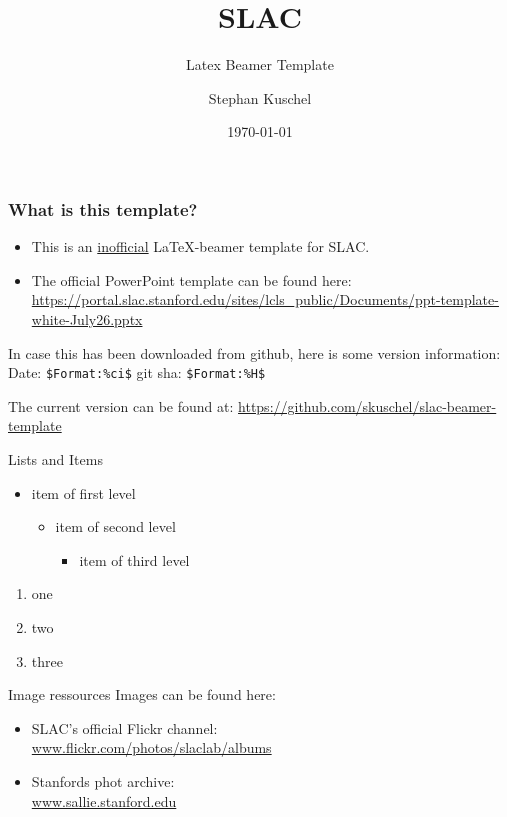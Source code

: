 \documentclass{beamer}
\title{SLAC}
\subtitle{Latex Beamer Template}
\author{Stephan Kuschel}
\institute{SLAC National Accelerator Laboratory}
\date{\today}
\begin{document}
\frame{\titlepage}


\begin{frame}[fragile]
\frametitle{What is this template?}
\begin{itemize}
\item This is an \underline{inofficial} \LaTeX-beamer template for SLAC.
\item The official PowerPoint template can be found here: \\
\url{https://portal.slac.stanford.edu/sites/lcls_public/Documents/ppt-template-white-July26.pptx}
\end{itemize}
In case this has been downloaded from github, here is some version information: \\
Date: \verb|$Format:%ci$|
git sha: \verb|$Format:%H$|

The current version can be found at:
\url{https://github.com/skuschel/slac-beamer-template}
\end{frame}


\begin{frame}{Lists and Items}
  \begin{itemize}
    \item item of first level
    \begin{itemize}
      \item item of second level
      \begin{itemize}
        \item item of third level
      \end{itemize}
    \end{itemize}
  \end{itemize}
  \begin{enumerate}
    \item one
    \item two
    \item three
  \end{enumerate}
\end{frame}


\begin{frame}{Image ressources}
Images can be found here:
\begin{itemize}
  \item SLAC's official Flickr channel: \\
  \url{www.flickr.com/photos/slaclab/albums}
  \item Stanfords phot archive: \\
  \url{www.sallie.stanford.edu}
\end{itemize}
\end{frame}
\end{document}
